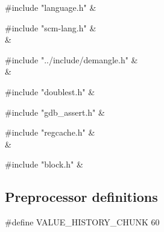 \medskip
\begin{cxreftabi}
{\stt \#include "language.h"} &\\
\end{cxreftabi}

\medskip
\begin{cxreftabi}
{\stt \#include "scm-lang.h"} &\\
\hspace*{0.2in}{\stt \#include "scm-tags.h"} &\\
\end{cxreftabi}

\medskip
\begin{cxreftabi}
{\stt \#include "../include/demangle.h"} &\\
\hspace*{0.2in}{\stt \#include "../include/libiberty.h"} &\\
\end{cxreftabi}

\medskip
\begin{cxreftabi}
{\stt \#include "doublest.h"} &\\
\end{cxreftabi}

\medskip
\begin{cxreftabi}
{\stt \#include "gdb\_assert.h"} &\\
\end{cxreftabi}

\medskip
\begin{cxreftabi}
{\stt \#include "regcache.h"} &\\
\hspace*{0.2in}{\stt \#include "../include/ansidecl.h"} &\\
\end{cxreftabi}

\medskip
\begin{cxreftabi}
{\stt \#include "block.h"} &\\
\end{cxreftabi}


\subsection*{Preprocessor definitions}

{\stt \#define VALUE\_HISTORY\_CHUNK 60}


